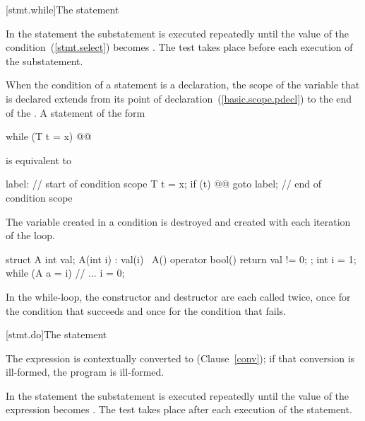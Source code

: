 [stmt.while]{The  statement}%

\pnum
In the  statement the substatement is executed repeatedly
until the value of the condition~(\ref{stmt.select}) becomes
. The test takes place before each execution of the
substatement.

\pnum
{}%
When the condition of a  statement is a declaration, the scope of
the variable that is declared extends from its point of
declaration~(\ref{basic.scope.pdecl}) to the end of the 
. A  statement of the form

\begin{codeblock}
while (T t = x) @@
\end{codeblock}

is equivalent to

\begin{codeblock}
label:
{                   // start of condition scope
  T t = x;
  if (t) {
    @@
    goto label;
  }
}                   // end of condition scope
\end{codeblock}

The variable created in a condition is destroyed and created with each
iteration of the loop.
\begin{example}

\begin{codeblock}
struct A {
  int val;
  A(int i) : val(i) { }
  ~A() { }
  operator bool() { return val != 0; }
};
int i = 1;
while (A a = i) {
  // ...
  i = 0;
}
\end{codeblock}

In the while-loop, the constructor and destructor are each called twice,
once for the condition that succeeds and once for the condition that
fails.
\end{example}

[stmt.do]{The  statement}%

\pnum
The expression is contextually converted to  (Clause~\ref{conv});
if that conversion is ill-formed, the program is ill-formed.

\pnum
In the  statement the substatement is executed repeatedly
until the value of the expression becomes . The test takes
place after each execution of the statement.


